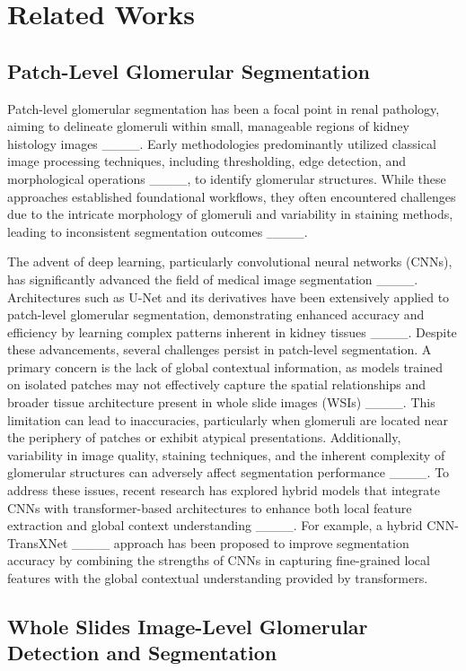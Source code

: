 \section{Related Works}
\subsection{Patch-Level Glomerular Segmentation}
    
Patch-level glomerular segmentation has been a focal point in renal pathology, aiming to delineate glomeruli within small, manageable regions of kidney histology images ____. Early methodologies predominantly utilized classical image processing techniques, including thresholding, edge detection, and morphological operations ____, to identify glomerular structures. While these approaches established foundational workflows, they often encountered challenges due to the intricate morphology of glomeruli and variability in staining methods, leading to inconsistent segmentation outcomes ____.

The advent of deep learning, particularly convolutional neural networks (CNNs), has significantly advanced the field of medical image segmentation ____. Architectures such as U-Net and its derivatives have been extensively applied to patch-level glomerular segmentation, demonstrating enhanced accuracy and efficiency by learning complex patterns inherent in kidney tissues ____.
Despite these advancements, several challenges persist in patch-level segmentation. A primary concern is the lack of global contextual information, as models trained on isolated patches may not effectively capture the spatial relationships and broader tissue architecture present in whole slide images (WSIs) ____. This limitation can lead to inaccuracies, particularly when glomeruli are located near the periphery of patches or exhibit atypical presentations. Additionally, variability in image quality, staining techniques, and the inherent complexity of glomerular structures can adversely affect segmentation performance ____. 
To address these issues, recent research has explored hybrid models that integrate CNNs with transformer-based architectures to enhance both local feature extraction and global context understanding ____. For example, a hybrid CNN-TransXNet ____ approach has been proposed to improve segmentation accuracy by combining the strengths of CNNs in capturing fine-grained local features with the global contextual understanding provided by transformers.


    \subsection{Whole Slides Image-Level Glomerular Detection and Segmentation}

